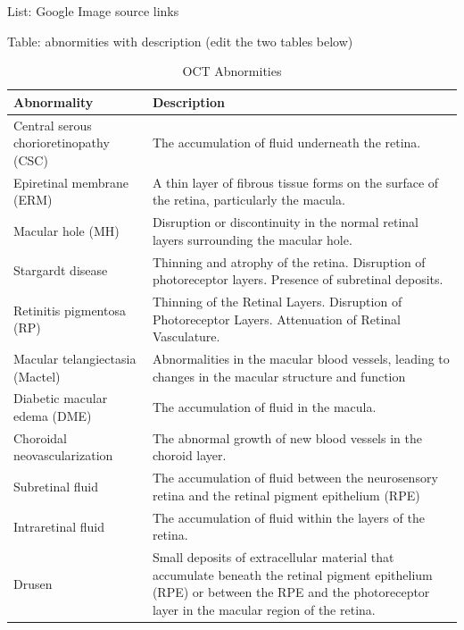 \documentclass{article}
\begin{document}
	List: Google Image source links
	
	Table: abnormities with description (edit the two tables below)
	
	{
		\fontsize{9}{12}\selectfont
		{
			\begin{longtable}{lp{3.8in}}
				\caption{OCT Abnormities}
				\label{tb:oct-abnormites}\\
				\toprule
				Abnormality&Description\\
				\toprule
				
				\multicolumn{1}{l}{Central serous chorioretinopathy (CSC)}
				& \multicolumn{1}{l}{The accumulation of fluid underneath the retina.}\\
				
				\multicolumn{1}{l}{Epiretinal membrane (ERM)}
				& A thin layer of fibrous tissue forms on the surface of the retina, particularly the macula.\\
				
				\multicolumn{1}{l}{Macular hole (MH)}
				& Disruption or discontinuity in the normal retinal layers surrounding the macular hole.\\
				
				\multicolumn{1}{l}{Stargardt disease}
				& Thinning and atrophy of the retina. Disruption of photoreceptor layers. Presence of subretinal deposits.\\
				
				\multicolumn{1}{l}{Retinitis pigmentosa (RP)}
				& Thinning of the Retinal Layers. Disruption of Photoreceptor Layers. Attenuation of Retinal Vasculature.\\
				
				\multicolumn{1}{l}{Macular telangiectasia (Mactel)}
				& Abnormalities in the macular blood vessels, leading to changes in the macular structure and function\\
				
				\multicolumn{1}{l}{Diabetic macular edema (DME)}
				& The accumulation of fluid in the macula. \\
				
				\multicolumn{1}{l}{Choroidal neovascularization}
				& The abnormal growth of new blood vessels in the choroid layer.\\
				
				\multicolumn{1}{l}{Subretinal fluid}
				&  The accumulation of fluid between the neurosensory retina and the retinal pigment epithelium (RPE)\\
				
				\multicolumn{1}{l}{Intraretinal fluid}
				& The accumulation of fluid within the layers of the retina.\\
				
				\multicolumn{1}{l}{Drusen}
				& Small deposits of extracellular material that accumulate beneath the retinal pigment epithelium (RPE) or between the RPE and the photoreceptor layer in the macular region of the retina.\\
				
				\bottomrule
			\end{longtable}
		}
	}
	
\end{document}
